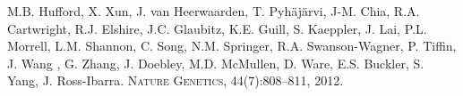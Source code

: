 \documentclass[11pt,letterpaper]{article}
\begin{document}
\large{ 
M.B. Hufford, X. Xun, J. van Heerwaarden, T. Pyh\"aj\"arvi, J-M. Chia, R.A. Cartwright, R.J. Elshire, J.C. Glaubitz, K.E. Guill, S. Kaeppler, J. Lai, P.L. Morrell, L.M. Shannon, C. Song, N.M. Springer, R.A. Swanson-Wagner, P. Tiffin, J. Wang , G. Zhang, J. Doebley, M.D. McMullen, D. Ware, E.S. Buckler, S. Yang, J. Ross-Ibarra. 
\textsc{Nature Genetics}, 44(7):808–811, 2012.}

\noindent

 
\end{document}

